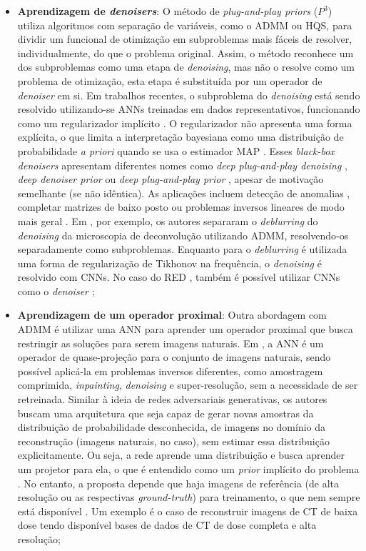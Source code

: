 \begin{itemize}
\item \textbf{Aprendizagem de \textit{denoisers}}: O método de \textit{plug-and-play priors} ($P^3$) \cite{VenkaPlugplay2013} utiliza algoritmos com separação de variáveis, como o ADMM ou HQS, para dividir um funcional de otimização em subproblemas mais fáceis de resolver, individualmente, do que o problema original. Assim, o método reconhece um dos subproblemas como uma etapa de \textit{denoising}, mas não o resolve como um problema de otimização, esta etapa é substituída por um operador de \textit{denoiser} em si. Em trabalhos recentes, o subproblema do \textit{denoising} está sendo resolvido utilizando-se ANNs treinadas em dados representativos, funcionando como um regularizador implícito \cite{Siavash2020, Zhang2019plug}. O regularizador não apresenta uma forma explícita, o que limita a interpretação bayesiana como uma distribuição de probabilidade \textit{a priori} quando se usa o estimador MAP \cite[pág. 61]{Arridge2019}. Esses \textit{black-box denoisers} \cite{Arridge2019} apresentam diferentes nomes como \textit{deep plug-and-play denoising} \cite{Fu2021},  \textit{deep denoiser prior} \cite{zhang2021plugandplay} ou \textit{deep plug-and-play prior} \cite{ZHAO2020137}, apesar de motivação semelhante (se não idêntica). As aplicações incluem detecção de anomalias \cite{Fu2021}, completar matrizes de baixo posto  \cite{ZHAO2020137} ou problemas inversos lineares de modo mais geral \cite{Guo2019, kadkhodaie2021solving}. Em \cite{Liu2020}, por exemplo, os autores separaram o \textit{deblurring} do \textit{denoising} da microscopia de deconvolução utilizando ADMM, resolvendo-os separadamente como subproblemas. Enquanto para o \textit{deblurring} é utilizada uma forma de regularização de Tikhonov na frequência, o \textit{denoising} é resolvido com CNNs. No caso do RED \cite{Romano2017}, também é possível utilizar CNNs como o \textit{denoiser} \cite{Arridge2019};

\item \textbf{Aprendizagem de um operador proximal}: Outra abordagem com ADMM é utilizar uma ANN para aprender um operador proximal que busca restringir as soluções para serem imagens naturais. Em \cite{Chang_2017_ICCV}, a ANN é um operador de quase-projeção para o conjunto  de imagens naturais, sendo possível aplicá-la em problemas inversos diferentes, como amostragem comprimida, \textit{inpainting}, \textit{denoising} e super-resolução, sem a necessidade de ser retreinada. Similar à ideia de redes adversariais generativas, os autores buscam uma arquitetura que seja capaz de gerar novas amostras da distribuição de probabilidade desconhecida, de imagens no domínio da reconstrução (imagens naturais, no caso), sem estimar essa distribuição explicitamente. Ou seja, a rede aprende uma distribuição e busca aprender um projetor para ela, o que é entendido como um \textit{prior} implícito do problema \cite{Kaji2019}. No entanto, a proposta depende que haja imagens de referência (de alta resolução ou as respectivas \textit{ground-truth}) para treinamento, o que nem sempre está disponível \cite{Kaji2019}. Um exemplo é o caso de reconstruir imagens de CT de baixa dose tendo disponível bases de dados de CT de dose completa e alta resolução;



\end{itemize}
